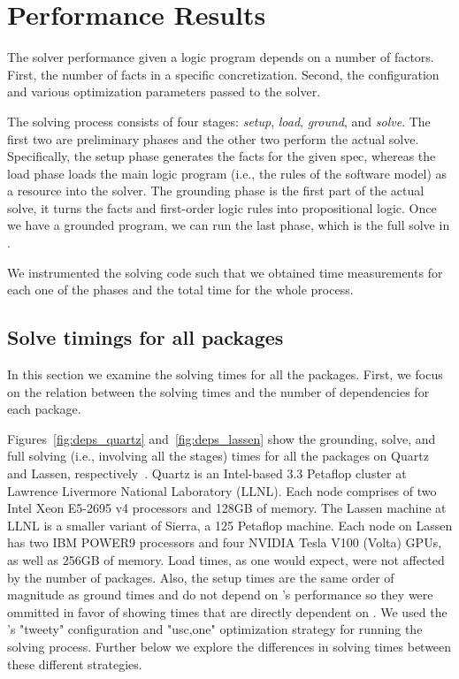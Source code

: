 \section{Performance Results}
\label{sec:perf-results}


The \clingo{} solver performance given a logic program depends on a number of factors. First, the number of facts in a specific concretization. Second, the configuration and various optimization parameters passed to the solver. 

The solving process consists of four stages: \emph{setup}, \emph{load}, \emph{ground}, and \emph{solve}. The first two are preliminary phases and the other two perform the actual solve. Specifically, the setup phase generates the facts for the given spec, whereas the load phase loads the main logic program (i.e., the rules of the software model) as a resource into the solver. The grounding phase is the first part of the actual solve, it turns the facts and first-order logic rules into propositional logic. Once we have a grounded program, we can run the last phase, which is the full solve in \clingo{}.

We instrumented the solving code such that we obtained time measurements for each one of the phases and the total time for the whole process.

\subsection{Solve timings for all packages}

In this section we examine the solving times for all the packages. First, we focus on the relation between the solving times and the number of dependencies for each package.





Figures~\ref{fig:deps_quartz} and~\ref{fig:deps_lassen} show the grounding, solve, and full solving (i.e., involving all the stages) times for all the packages on Quartz and Lassen, respectively~\cite{llnl:hpc}. Quartz is an Intel-based 3.3 Petaflop cluster at Lawrence Livermore National Laboratory (LLNL). Each node comprises of two Intel Xeon E5-2695 v4 processors and 128GB of memory. The Lassen machine at LLNL is a smaller variant of Sierra, a 125 Petaflop machine. Each node on Lassen has two IBM POWER9 processors and four NVIDIA Tesla V100 (Volta) GPUs, as well as 256GB of memory. Load times, as one would expect, were not affected by the number of packages. Also, the setup times are the same order of magnitude as ground times and do not depend on \clingo{}'s performance so they were ommitted in favor of showing times that are directly dependent on \clingo{}. We used the \clingo{}'s "tweety" configuration and "usc,one" optimization strategy for running the solving process. Further below we explore the differences in solving times between these different strategies.

